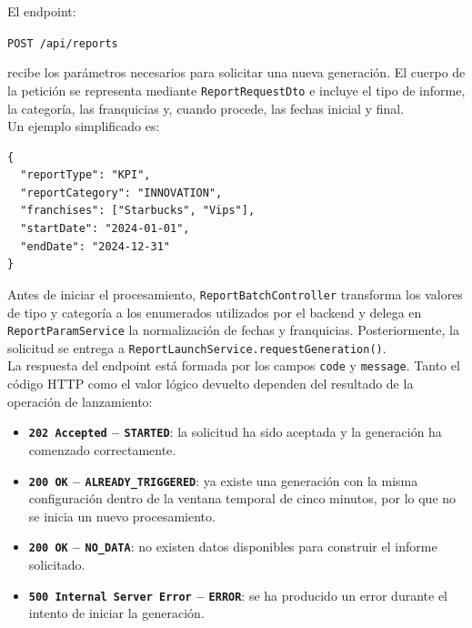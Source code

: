 \documentclass[11pt,a4paper,titlepage,oneside]{report}
\begin{document}
El endpoint:

\begin{center}
\texttt{POST /api/reports}
\end{center}

recibe los parámetros necesarios para solicitar una nueva generación. El
cuerpo de la petición se representa mediante \texttt{ReportRequestDto} e
incluye el tipo de informe, la categoría, las franquicias y, cuando procede,
las fechas inicial y final. \\

Un ejemplo simplificado es:

\begin{lstlisting}[caption={Ejemplo de solicitud de generación en JSON}]
{
  "reportType": "KPI",
  "reportCategory": "INNOVATION",
  "franchises": ["Starbucks", "Vips"],
  "startDate": "2024-01-01",
  "endDate": "2024-12-31"
}
\end{lstlisting}

Antes de iniciar el procesamiento,
\texttt{ReportBatchController} transforma los valores de tipo y categoría a
los enumerados utilizados por el backend y delega en
\texttt{ReportParamService} la normalización de fechas y franquicias.
Posteriormente, la solicitud se entrega a
\texttt{ReportLaunchService.requestGeneration()}. \\

La respuesta del endpoint está formada por los campos \texttt{code} y
\texttt{message}. Tanto el código HTTP como el valor lógico devuelto dependen
del resultado de la operación de lanzamiento:

\begin{itemize}

  \item \textbf{\texttt{202 Accepted} -- \texttt{STARTED}}: la solicitud ha
  sido aceptada y la generación ha comenzado correctamente.

  \item \textbf{\texttt{200 OK} -- \texttt{ALREADY\_TRIGGERED}}: ya existe
  una generación con la misma configuración dentro de la ventana temporal de
  cinco minutos, por lo que no se inicia un nuevo procesamiento.

  \item \textbf{\texttt{200 OK} -- \texttt{NO\_DATA}}: no existen datos
  disponibles para construir el informe solicitado.

  \item \textbf{\texttt{500 Internal Server Error} -- \texttt{ERROR}}: se ha
  producido un error durante el intento de iniciar la generación.

\end{itemize}
\end{document}

